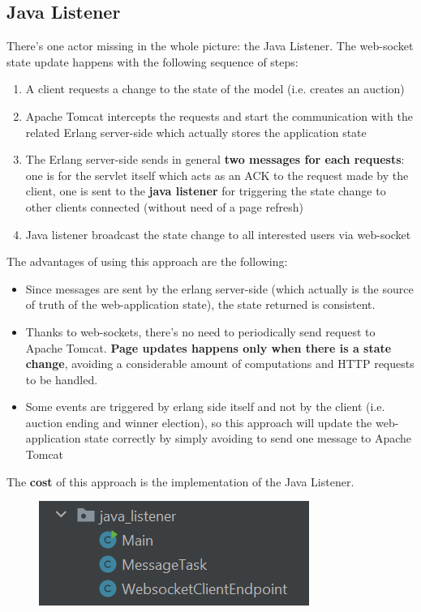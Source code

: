 \subsection{Java Listener}
There's one actor missing in the whole picture: the Java Listener.
The web-socket state update happens with the following sequence of steps:
\begin{enumerate}
	\item A client requests a change to the state of the model (i.e. creates an auction)
	\item Apache Tomcat intercepts the requests and start the communication with the related Erlang server-side which actually stores the application state
	\item The Erlang server-side sends in general \textbf{two messages for each requests}: one is for the servlet itself which acts as an ACK to the request made by the client, one is sent to the \textbf{java listener} for triggering the state change to other clients connected (without need of a page refresh)
	\item Java listener broadcast the state change to all interested users via web-socket
\end{enumerate}  
The advantages of using this approach are the following:
\begin{itemize}
	\item Since messages are sent by the erlang server-side (which actually is the source of truth of the web-application state), the state returned is consistent.
	\item Thanks to web-sockets, there's no need to periodically send request to Apache Tomcat. \textbf{Page updates happens only when there is a state change}, avoiding a considerable amount of computations and HTTP requests to be handled. 
	\item Some events are triggered by erlang side itself and not by the client (i.e. auction ending and winner election), so this approach will update the web-application state correctly by simply avoiding to send one message to Apache Tomcat
\end{itemize}
The \textbf{cost} of this approach is the implementation of the Java Listener.
\begin{figure}[H]
	\centering
	\includegraphics[width=0.4\linewidth]{img/java_listener}
	\caption{}
	\label{fig:javalistener}
\end{figure}

